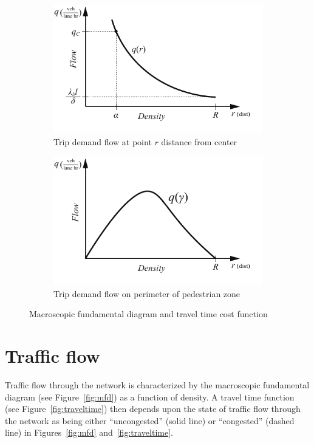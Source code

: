 \documentclass{article}
\begin{document}
\begin{figure}[!ht]
     \centering
     \hfill
     \begin{subfigure}[b]{0.45\textwidth}
         \centering
         \includegraphics[width=\textwidth]{writing/concept/figures/diagram_flow_across}
         \caption{Trip demand flow at point $r$ distance from center}
         \label{fig:flowacross}
     \end{subfigure}
     \hfill
     \begin{subfigure}[b]{0.45\textwidth}
         \centering
         \includegraphics[width=\textwidth]{writing/concept/figures/diagram_perim_flow}
         \caption{Trip demand flow on perimeter of pedestrian zone}
         \label{fig:perimflow}
     \end{subfigure}
     \hfill
     \caption{Macroscopic fundamental diagram and travel time cost function}
\end{figure}

\section{Traffic flow}
Traffic flow through the network is characterized by the macroscopic fundamental diagram (see Figure~\ref{fig:mfd}) as a function of density. A travel time function (see Figure~\ref{fig:traveltime}) then depends upon the state of traffic flow through the network as being either ``uncongested'' (solid line) or ``congested'' (dashed line) in Figures~\ref{fig:mfd} and~\ref{fig:traveltime}.
\end{document}
